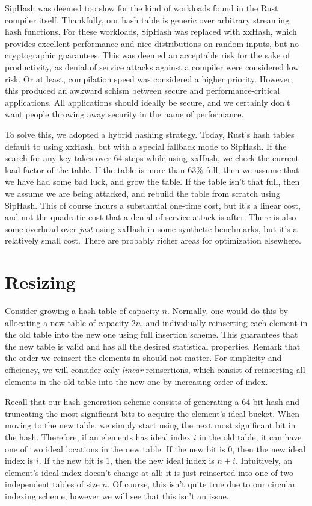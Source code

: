 \documentclass{cccg13}
\begin{document}
SipHash was deemed too slow for the kind of workloads found in the Rust compiler itself. Thankfully, our hash table is generic over arbitrary streaming hash functions. For these workloads, SipHash was replaced with xxHash, which provides excellent performance and nice distributions on random inputs, but no cryptographic guarantees. This was deemed an acceptable risk for the sake of productivity, as denial of service attacks against a compiler were considered low risk. Or at least, compilation speed was considered a higher priority. However, this produced an awkward schism between secure and performance-critical applications. All applications should ideally be secure, and we certainly don't want people throwing away security in the name of performance.

To solve this, we adopted a hybrid hashing strategy. Today, Rust's hash tables default to using xxHash, but with a special fallback mode to SipHash. If the search for any key takes over 64 steps while using xxHash, we check the current load factor of the table. If the table is more than 63\% full, then we assume that we have had some bad luck, and grow the table. If the table isn't that full, then we assume we are being attacked, and rebuild the table from scratch using SipHash. This of course incurs a substantial one-time cost, but it's a linear cost, and not the quadratic cost that a denial of service attack is after. There is also some overhead over \emph{just} using xxHash in some synthetic benchmarks, but it's a relatively small cost. There are probably richer areas for optimization elsewhere.





\section{Resizing}

Consider growing a hash table of capacity $n$. Normally, one would do this by allocating a new table of capacity $2n$, and individually reinserting each element in the old table into the new one using full insertion scheme. This guarantees that the new table is valid and has all the desired statistical properties. Remark that the order we reinsert the elements in should not matter. For simplicity and efficiency, we will consider only \emph{linear} reinsertions, which consist of reinserting all elements in the old table into the new one by increasing order of index.

Recall that our hash generation scheme consists of generating a 64-bit hash and truncating the most significant bits to acquire the element's ideal bucket. When moving to the new table, we simply start using the next most significant bit in the hash. Therefore, if an elements has ideal index $i$ in the old table, it can have one of two ideal locations in the new table. If the new bit is $0$, then the new ideal index is $i$. If the new bit is $1$, then the new ideal index is $n + i$. Intuitively, an element's ideal index doesn't change at all; it is just reinserted into one of two independent tables of size $n$. Of course, this isn't quite true due to our circular indexing scheme, however we will see that this isn't an issue.
\end{document}
